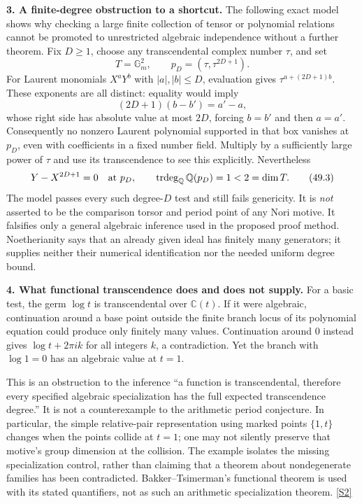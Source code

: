\documentclass[11pt,a4paper]{article}
\newcommand{\Q}{\mathbb{Q}}
\newcommand{\C}{\mathbb{C}}
\newcommand{\sref}[2]{\hyperlink{source:#1:#2}{[S#2]}}
\numberwithin{equation}{section}
\begin{document}
\textbf{3. A finite-degree obstruction to a shortcut.}
The following exact model shows why checking a large finite collection
of tensor or polynomial relations cannot be promoted to unrestricted
algebraic independence without a further theorem. Fix $D\ge1$, choose
any transcendental complex number $\tau$, and set
\[
 T=\mathbb G_m^2,\qquad
 p_D=(\tau,\tau^{2D+1}).
\]
For Laurent monomials $X^aY^b$ with $|a|,|b|\le D$, evaluation gives
$\tau^{a+(2D+1)b}$. These exponents are all distinct: equality would
imply
\[
 (2D+1)(b-b')=a'-a,
\]
whose right side has absolute value at most $2D$, forcing $b=b'$ and then
$a=a'$. Consequently no nonzero Laurent polynomial supported in that box
vanishes at $p_D$, even with coefficients in a fixed number field. Multiply
by a sufficiently large power of $\tau$ and use its transcendence to see
this explicitly. Nevertheless
\[
 Y-X^{2D+1}=0\quad\hbox{at }p_D,\qquad
 \operatorname{trdeg}_{\Q}\Q(p_D)=1<2=\dim T.
 \tag{49.3}
\]
The model passes every such degree-$D$ test and still fails genericity.
It is \emph{not} asserted to be the comparison torsor and period point
of any Nori motive. It falsifies only a general algebraic inference used
in the proposed proof method. Noetherianity says that an already given
ideal has finitely many generators; it supplies neither their numerical
identification nor the needed uniform degree bound.

\textbf{4. What functional transcendence does and does not supply.}
For a basic test, the germ $\log t$ is transcendental over $\C(t)$.
If it were algebraic, continuation around a base point outside the finite
branch locus of its polynomial equation could produce only finitely many
values. Continuation around $0$ instead gives $\log t+2\pi i k$ for all
integers $k$, a contradiction. Yet the branch with $\log1=0$ has an
algebraic value at $t=1$.

This is an obstruction to the inference ``a function is transcendental,
therefore every specified algebraic specialization has the full expected
transcendence degree.'' It is not a counterexample to the arithmetic period
conjecture. In particular, the simple relative-pair representation using
marked points $\{1,t\}$ changes when the points collide at $t=1$; one may
not silently preserve that motive's group dimension at the collision.
The example isolates the missing specialization control, rather than
claiming that a theorem about nondegenerate families has been contradicted.
Bakker--Tsimerman's functional theorem is used with its stated quantifiers,
not as such an arithmetic specialization theorem. \sref{statement}{2}
\end{document}
